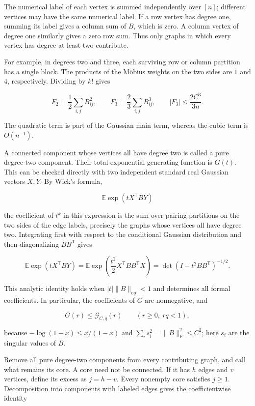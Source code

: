 \documentclass[11pt,a4paper]{article}
\begin{document}
The numerical label of each vertex is summed independently over \([n]\); different vertices may have the same numerical label. If a row vertex has degree one, summing its label gives a column sum of \(B\), which is zero. A column vertex of degree one similarly gives a zero row sum. Thus only graphs in which every vertex has degree at least two contribute.

For example, in degrees two and three, each surviving row or column partition has a single block. The products of the Möbius weights on the two sides are \(1\) and \(4\), respectively. Dividing by \(k!\) gives

\[
F_2=\frac12\sum_{i,j}B_{ij}^2,
\qquad
F_3=\frac23\sum_{i,j}B_{ij}^3,
\qquad |F_3|\le\frac{2C^3}{3n}.
\]

The quadratic term is part of the Gaussian main term, whereas the cubic term is \(O(n^{-1})\).

A connected component whose vertices all have degree two is called a pure degree-two component. Their total exponential generating function is \(G(t)\). This can be checked directly with two independent standard real Gaussian vectors \(X,Y\). By Wick's formula,

\[
\mathbb E\exp(tX^{\mathsf T}BY)
\]

the coefficient of \(t^k\) in this expression is the sum over pairing partitions on the two sides of the edge labels, precisely the graphs whose vertices all have degree two. Integrating first with respect to the conditional Gaussian distribution and then diagonalizing \(BB^{\mathsf T}\) gives

\[
\mathbb E\exp(tX^{\mathsf T}BY)
=\mathbb E\exp\!\left(\frac{t^2}{2}X^{\mathsf T}BB^{\mathsf T}X\right)
=\det(I-t^2BB^{\mathsf T})^{-1/2}.
\]

This analytic identity holds when \(|t|\|B\|_{\mathrm{op}}<1\) and determines all formal coefficients. In particular, the coefficients of \(G\) are nonnegative, and

\[
G(r)\le\mathcal G_{C,q}(r)\qquad(r\ge0,\ rq<1),
\]

because \(-\log(1-x)\le x/(1-x)\) and \(\sum_i s_i^2=\|B\|_{\mathrm F}^2\le C^2\); here \(s_i\) are the singular values of \(B\).

Remove all pure degree-two components from every contributing graph, and call what remains its core. A core need not be connected. If it has \(h\) edges and \(v\) vertices, define its excess as \(j=h-v\). Every nonempty core satisfies \(j\ge1\). Decomposition into components with labeled edges gives the coefficientwise identity
\end{document}
